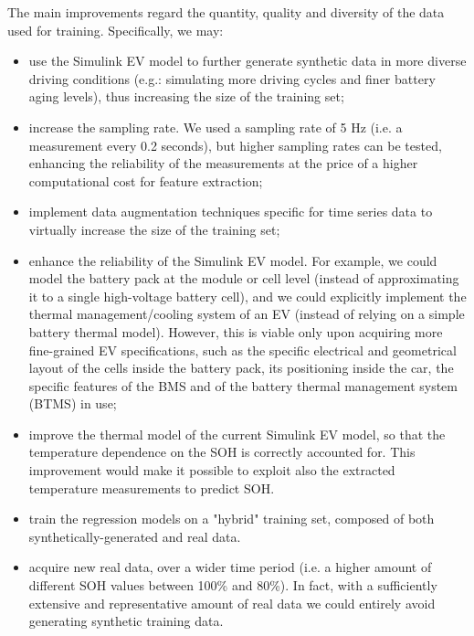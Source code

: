 The main improvements regard the quantity, quality and diversity of the data used for training. Specifically, we may:
\begin{itemize}
    \item use the Simulink EV model to further generate synthetic data in more diverse driving conditions (e.g.: simulating more driving cycles and finer battery aging levels), thus increasing the size of the training set;
    \item increase the sampling rate. We used a sampling rate of 5 Hz (i.e. a measurement every 0.2 seconds), but higher sampling rates can be tested, enhancing the reliability of the measurements at the price of a higher computational cost for feature extraction;
    \item implement data augmentation techniques specific for time series data \cite{da_ts} to virtually increase the size of the training set;
    \item enhance the reliability of the Simulink EV model. For example, we could model the battery pack at the module or cell level (instead of approximating it to a single high-voltage battery cell), and we could explicitly implement the thermal management/cooling system of an EV (instead of relying on a simple battery thermal model). However, this is viable only upon acquiring more fine-grained EV specifications, such as the specific electrical and geometrical layout of the cells inside the battery pack, its positioning inside the car, the specific features of the BMS and of the battery thermal management system (BTMS) in use;
    \item improve the thermal model of the current Simulink EV model, so that the temperature dependence on the SOH is correctly accounted for. This improvement would make it possible to exploit also the extracted temperature measurements to predict SOH.
    \item train the regression models on a "hybrid" training set, composed of both synthetically-generated and real data.
    \item acquire new real data, over a wider time period (i.e. a higher amount of different SOH values between 100\% and 80\%). In fact, with a sufficiently extensive and representative amount of real data we could entirely avoid generating synthetic training data.
\end{itemize}

